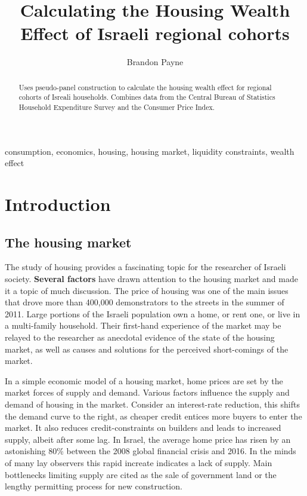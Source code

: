 \documentclass[12pt,a4paper,]{article}
\title{Calculating the Housing Wealth Effect of Israeli regional cohorts}
\author{Brandon Payne}
\date{}
\begin{document}
\maketitle

\begin{abstract}
Uses pseudo-panel construction to calculate the housing wealth effect for regional cohorts of Isreali households. Combines data from the Central Bureau of Statistics Household Expenditure Survey and the Consumer Price Index.
\end{abstract}

\begin{keywords}
 consumption, economics, housing, housing market, liquidity constraints, wealth effect 
\end{keywords}

\newpage

\section{Introduction}\label{introduction}

\subsection{The housing market}\label{the-housing-market}

The study of housing provides a fascinating topic for the researcher of
Israeli society. \textbf{Several factors} have drawn attention to the
housing market and made it a topic of much discussion. The price of
housing was one of the main issues that drove more than 400,000
demonstrators to the streets in the summer of 2011. Large portions of
the Israeli population own a home, or rent one, or live in a
multi-family household. Their first-hand experience of the market may be
relayed to the researcher as anecdotal evidence of the state of the
housing market, as well as causes and solutions for the perceived
short-comings of the market.

In a simple economic model of a housing market, home prices are set by
the market forces of supply and demand. Various factors influence the
supply and demand of housing in the market. Consider an interest-rate
reduction, this shifts the demand curve to the right, as cheaper credit
entices more buyers to enter the market. It also reduces
credit-constraints on builders and leads to increased supply, albeit
after some lag. In Israel, the average home price has risen by an
astonishing 80\% between the 2008 global financial crisis and 2016. In
the minds of many lay observers this rapid increate indicates a lack of
supply. Main bottlenecks limiting supply are cited as the sale of
government land or the lengthy permitting process for new construction.
\end{document}
